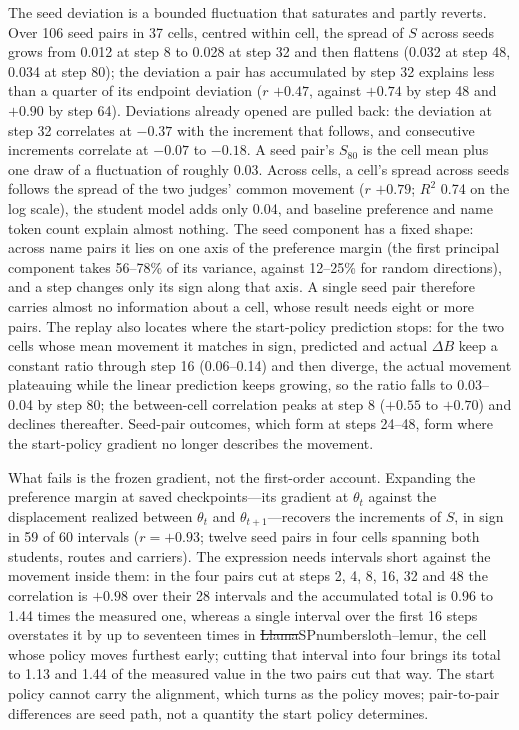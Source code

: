 The seed deviation is a bounded fluctuation that saturates and partly reverts. Over 106 seed pairs in 37 cells, centred within cell, the spread of $S$ across seeds grows from 0.012 at step 8 to 0.028 at step 32 and then flattens (0.032 at step 48, 0.034 at step 80); the deviation a pair has accumulated by step 32 explains less than a quarter of its endpoint deviation ($r$ $+0.47$, against $+0.74$ by step 48 and $+0.90$ by step 64). Deviations already opened are pulled back: the deviation at step 32 correlates at $-0.37$ with the increment that follows, and consecutive increments correlate at $-0.07$ to $-0.18$. A seed pair's $S_{80}$ is the cell mean plus one draw of a fluctuation of roughly 0.03. Across cells, a cell's spread across seeds follows the spread of the two judges' common movement ($r$ $+0.79$; $R^2$ 0.74 on the log scale), the student model adds only 0.04, and baseline preference and name token count explain almost nothing. The seed component has a fixed shape: across name pairs it lies on one axis of the preference margin (the first principal component takes 56--78\% of its variance, against 12--25\% for random directions), and a step changes only its sign along that axis. A single seed pair therefore carries almost no information about a cell, whose result needs eight or more pairs. The replay also locates where the start-policy prediction stops: for the two cells whose mean movement it matches in sign, predicted and actual $\Delta B$ keep a constant ratio through step 16 (0.06--0.14) and then diverge, the actual movement plateauing while the linear prediction keeps growing, so the ratio falls to 0.03--0.04 by step 80; the between-cell correlation peaks at step 8 ($+0.55$ to $+0.70$) and declines thereafter. Seed-pair outcomes, which form at steps 24--48, form where the start-policy gradient no longer describes the movement.

What fails is the frozen gradient, not the first-order account. Expanding the preference margin at saved checkpoints---its gradient at $\theta_t$ against the displacement realized between $\theta_t$ and $\theta_{t+1}$---recovers the increments of $S$, in sign in 59 of 60 intervals ($r = +0.93$; twelve seed pairs in four cells spanning both students, routes and carriers). The expression needs intervals short against the movement inside them: in the four pairs cut at steps 2, 4, 8, 16, 32 and 48 the correlation is $+0.98$ over their 28 intervals and the accumulated total is 0.96 to 1.44 times the measured one, whereas a single interval over the first 16 steps overstates it by up to seventeen times in \st{Llama}{SP}{number}{sloth--lemur}, the cell whose policy moves furthest early; cutting that interval into four brings its total to 1.13 and 1.44 of the measured value in the two pairs cut that way. The start policy cannot carry the alignment, which turns as the policy moves; pair-to-pair differences are seed path, not a quantity the start policy determines.

